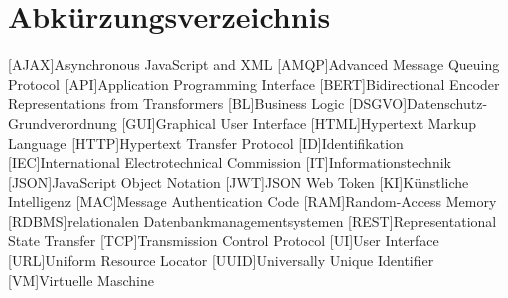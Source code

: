 \section{Abkürzungsverzeichnis}
\begin{acronym}
	[AJAX]{Asynchronous JavaScript and XML}
	[AMQP]{Advanced Message Queuing Protocol}
	[API]{Application Programming Interface}
	[BERT]{Bidirectional Encoder Representations from Transformers}
	[BL]{Business Logic}
	[DSGVO]{Datenschutz-Grundverordnung}
	[GUI]{Graphical User Interface}
	[HTML]{Hypertext Markup Language}
	[HTTP]{Hypertext Transfer Protocol}
	[ID]{Identifikation}
	[IEC]{International Electrotechnical Commission}
	[IT]{Informationstechnik}
	[JSON]{JavaScript Object Notation}
	[JWT]{JSON Web Token}
	[KI]{Künstliche Intelligenz}
	[MAC]{Message Authentication Code}
	[RAM]{Random-Access Memory}
	[RDBMS]{relationalen Datenbankmanagementsystemen}
	[REST]{Representational State Transfer}
	[TCP]{Transmission Control Protocol}
	[UI]{User Interface}
	[URL]{Uniform Resource Locator}
	[UUID]{Universally Unique Identifier}
	[VM]{Virtuelle Maschine}
\end{acronym}
